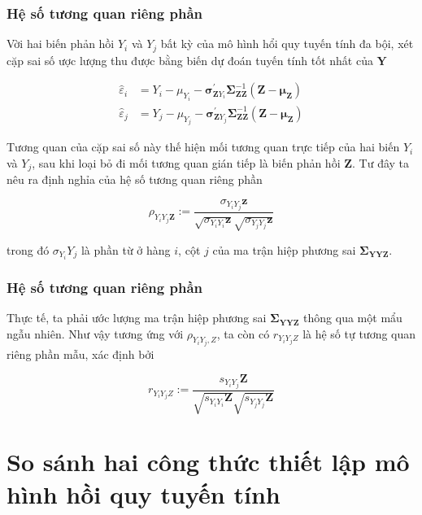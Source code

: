 \begin{frame}
\frametitle{Hệ số tương quan riêng phần}

Vời hai biến phản hồi $Y_i$ và $Y_j$ bất kỳ của mô hình hổi quy tuyến tính đa bội, xét cặp sai số ược lượng thu được bằng biến dự đoán tuyến tính tốt nhất của $\boldsymbol{Y}$

$$
\begin{aligned}
\hat{\varepsilon}_i & =Y_i-\mu_{Y_i}-\boldsymbol{\sigma}_{\mathbf{Z} Y_i}^{\prime} \boldsymbol{\Sigma}_{\mathbf{Z Z}}^{-1}\left(\boldsymbol{Z}-\boldsymbol{\mu}_{\mathbf{Z}}\right) \\
\hat{\varepsilon}_j & =Y_j-\mu_{Y_j}-\boldsymbol{\sigma}_{\mathbf{Z} Y_j}^{\prime} \boldsymbol{\Sigma}_{\mathbf{Z Z}}^{-1}\left(\boldsymbol{Z}-\boldsymbol{\mu}_{\mathbf{Z}}\right)
\end{aligned}
$$


Tương quan của cặp sai số này thế hiện mối tương quan trực tiếp của hai biến $Y_i$ và $Y_j$, sau khi loại bỏ đi mối tương quan gián tiếp là biến phản hồi 
$\boldsymbol{Z}$. Tư đây ta nêu ra định nghỉa của hệ số tương quan riêng phần

$$
\rho_{Y_i Y_j \mathbf{Z}}:=\frac{\sigma_{Y_i Y_j} \mathbf{z}}{\sqrt{\sigma_{Y_i Y_i} \mathbf{z}} \sqrt{\sigma_{Y_j Y_j} \mathbf{z}}}
$$

trong đó $\sigma_{Y_i} Y_j$ là phần từ ở hàng $i$, cột $j$ của ma trận hiệp phương sai $\boldsymbol{\Sigma}_{\boldsymbol{Y} \boldsymbol{Y} \mathbf{Z}}$.
\end{frame}



\begin{frame}
\frametitle{Hệ số tương quan riêng phần}
Thực tế, ta phải ước lượng ma trận hiệp phương sai $\boldsymbol{\Sigma}_{\boldsymbol{Y} \boldsymbol{Y} \boldsymbol{Z}}$ thông qua một mẩu ngẫu nhiên.
Như vậy tương ứng với $\rho_{Y_i Y_j, Z}$, ta còn có $r_{Y_i Y_j Z}$ là hệ số tự tương quan riêng phần mẫu, xác định bởi

$$
r_{Y_i Y_j Z}:=\frac{s_{Y_i Y_j} \mathbf{Z}}{\sqrt{s_{Y_i Y_i} \mathbf{Z}} \sqrt{s_{Y_j Y_j} \mathbf{Z}}}
$$
\end{frame}


\section{So sánh hai công thức thiết lập mô hình hồi quy tuyến tính}
